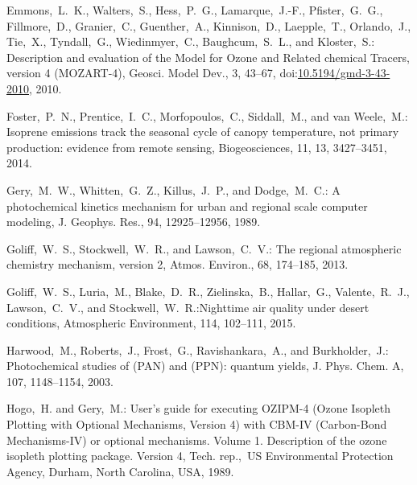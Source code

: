 \documentclass[acpd, online, hvmath]{copernicus}
\begin{document}
\begin{thebibliography}{34}
  Emmons,~L.~K., Walters,~S., Hess,~P.~G., Lamarque,~J.-F.,
  Pfister,~G.~G., Fillmore,~D., Granier,~C., Guenther,~A.,
  Kinnison,~D., Laepple,~T., Orlando,~J., Tie,~X., Tyndall,~G.,
  Wiedinmyer,~C., Baughcum,~S.~L., and Kloster,~S.: Description and
  evaluation of the Model for Ozone and Related chemical Tracers,
  version 4 (MOZART-4), Geosci. Model Dev., 3, 43--67,
  doi:\href{http://dx.doi.org/10.5194/gmd-3-43-2010}{10.5194/gmd-3-43-2010}, 2010.


    Foster,~P.~N., Prentice,~I.~C., Morfopoulos,~C., Siddall,~M., and van Weele,~M.: Isoprene emissions track the seasonal cycle of canopy temperature, not primary production: evidence from remote sensing, Biogeosciences, 11, 13, 3427--3451, 2014.



 Gery,~M.~W., Whitten,~G.~Z., Killus,~J.~P., and
  Dodge,~M.~C.: {A photochemical kinetics mechanism for urban and
    regional scale computer modeling}, J. Geophys. Res., 94,
  12925--12956, 1989.


 Goliff,~W.~S., Stockwell,~W.~R., and
  Lawson,~C.~V.: {The regional atmospheric chemistry mechanism,
    version 2}, Atmos. Environ., 68, 174--185, 2013.


     Goliff,~W.~S., Luria,~M., Blake,~D.~R., Zielinska,~B., Hallar,~G., Valente,~R.~J., Lawson,~C.~V., and Stockwell,~W.~R.:Nighttime air quality under desert conditions, Atmospheric Environment, 114, 102--111, 2015.


 Harwood,~M., Roberts,~J.,
  Frost,~G., Ravishankara,~A., and Burkholder,~J.: {Photochemical
    studies of  (PAN) and
     (PPN):  quantum yields},
  J. Phys. Chem. A, 107, 1148--1154, 2003.


 Hogo,~H. and Gery,~M.:
  User's guide for executing OZIPM-4 (Ozone Isopleth Plotting with
  Optional Mechanisms, Version 4) with CBM-IV (Carbon-Bond
  Mechanisms-IV) or optional mechanisms. Volume 1. Description of the
  ozone isopleth plotting package. Version 4, Tech. rep.,~US
  Environmental Protection Agency, Durham, North Carolina, USA, 1989.



\end{thebibliography}
\end{document}
